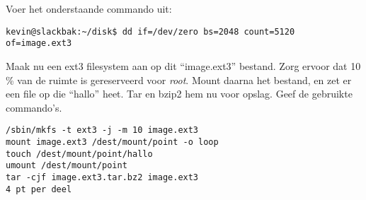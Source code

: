 
\question[20] Voer het onderstaande commando uit:
\begin{lstlisting}
kevin@slackbak:~/disk$ dd if=/dev/zero bs=2048 count=5120 of=image.ext3
\end{lstlisting}%
Maak nu een ext3 filesystem aan op dit ``image.ext3'' bestand. Zorg ervoor dat 10 \% van de ruimte is gereserveerd voor \emph{root}. Mount daarna het bestand, en zet er een file op die ``hallo'' heet. Tar en bzip2 hem nu voor opslag. Geef de gebruikte commando's. 
\begin{solution}
\begin{lstlisting}
/sbin/mkfs -t ext3 -j -m 10 image.ext3
mount image.ext3 /dest/mount/point -o loop
touch /dest/mount/point/hallo
umount /dest/mount/point
tar -cjf image.ext3.tar.bz2 image.ext3
4 pt per deel
\end{lstlisting}
\end{solution}
